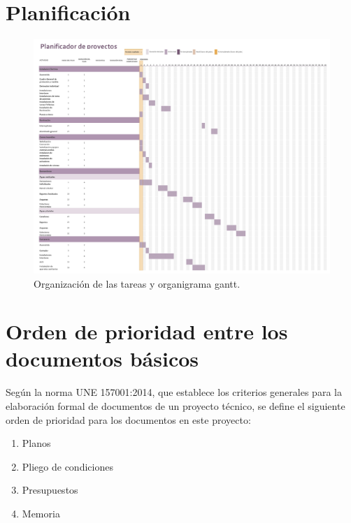 \documentclass[../main.tex]{subfiles}
\begin{document}
\section{Planificación}
\begin{figure}[H]
    \centering
    \includegraphics[width=1\linewidth]{Imagenes/Planificacion.png}
    \caption{Organización de las tareas y organigrama gantt.}
\end{figure}

\section{Orden de prioridad entre los documentos básicos}
Según la norma UNE 157001:2014, que establece los criterios generales para la elaboración formal de documentos de un proyecto técnico, se define el siguiente orden de prioridad para los documentos en este proyecto:
\begin{enumerate}
    \item Planos
    \item Pliego de condiciones
    \item Presupuestos
    \item Memoria
\end{enumerate}

\end{document}
